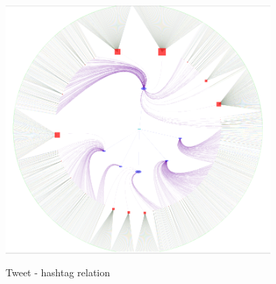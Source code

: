 \documentclass[11pt]{article}
\begin{document}
\begin{enumerate}
\begin{figure}[h]
\centering
\includegraphics[width=10cm, height=10cm]{HashtagToTweets.png}
\caption{Tweet - hashtag relation}
\end{figure}


\end{enumerate}
\end{document}
